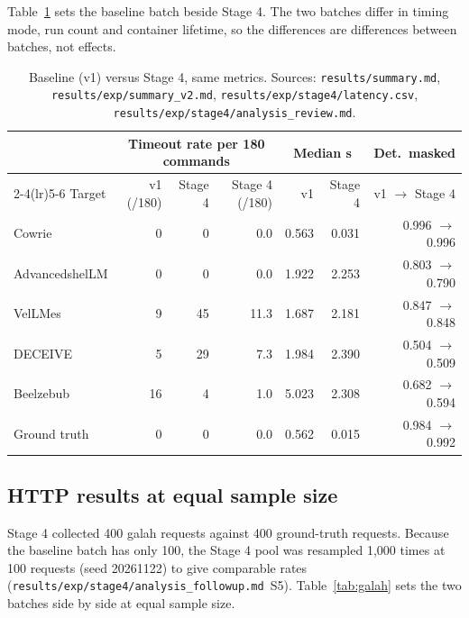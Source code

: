 \documentclass[a4paper,11pt]{article}
\begin{document}
Table~\ref{tab:s4-vs-v1} sets the baseline batch beside Stage 4. The two
batches differ in timing mode, run count and container lifetime, so the
differences are differences between batches, not effects.

\begin{table}[ht]
\centering
\caption{Baseline (v1) versus Stage 4, same metrics. Sources:
\texttt{results/summary.md}, \texttt{results/exp/summary\_v2.md},
\texttt{results/exp/stage4/latency.csv},
\texttt{results/exp/stage4/analysis\_review.md}.}
\label{tab:s4-vs-v1}
\scriptsize
\setlength{\tabcolsep}{4pt}
\begin{tabular}{@{}l r r r r r r@{}}
\toprule
 & \multicolumn{3}{c}{Timeout rate per 180 commands} & \multicolumn{2}{c}{Median s} & Det.\ masked \\
\cmidrule(lr){2-4}\cmidrule(lr){5-6}
Target & v1 (/180) & Stage 4 & Stage 4 (/180) & v1 & Stage 4 & v1 $\rightarrow$ Stage 4 \\
\midrule
Cowrie & 0 & 0 & 0.0 & 0.563 & 0.031 & 0.996 $\rightarrow$ 0.996 \\
AdvancedshelLM & 0 & 0 & 0.0 & 1.922 & 2.253 & 0.803 $\rightarrow$ 0.790 \\
VelLMes & 9 & 45 & 11.3 & 1.687 & 2.181 & 0.847 $\rightarrow$ 0.848 \\
DECEIVE & 5 & 29 & 7.3 & 1.984 & 2.390 & 0.504 $\rightarrow$ 0.509 \\
Beelzebub & 16 & 4 & 1.0 & 5.023 & 2.308 & 0.682 $\rightarrow$ 0.594 \\
Ground truth & 0 & 0 & 0.0 & 0.562 & 0.015 & 0.984 $\rightarrow$ 0.992 \\
\bottomrule
\end{tabular}
\end{table}

\subsection{HTTP results at equal sample size}

Stage 4 collected 400 galah requests against 400 ground-truth requests. Because
the baseline batch has only 100, the Stage 4 pool was resampled 1,000 times at
100 requests (seed 20261122) to give comparable rates
(\texttt{results/exp/stage4/analysis\_followup.md}~S5).
Table~\ref{tab:galah} sets the two batches side by side at equal sample size.
\end{document}
